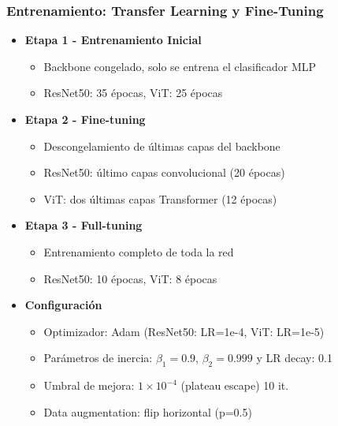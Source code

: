 \begin{frame}
\frametitle{Entrenamiento: Transfer Learning y Fine-Tuning}
\begin{itemize}
    \item \textbf{Etapa 1 - Entrenamiento Inicial}
    \begin{itemize}
        \item Backbone congelado, solo se entrena el clasificador MLP
        \item ResNet50: 35 épocas, ViT: 25 épocas
    \end{itemize}
    \item \textbf{Etapa 2 - Fine-tuning}
    \begin{itemize}
        \item Descongelamiento de últimas capas del backbone
        \item ResNet50: último capas convolucional (20 épocas)
        \item ViT: dos últimas capas Transformer (12 épocas)
    \end{itemize}
    \item \textbf{Etapa 3 - Full-tuning}
    \begin{itemize}
        \item Entrenamiento completo de toda la red
        \item ResNet50: 10 épocas, ViT: 8 épocas
    \end{itemize}
    \item \textbf{Configuración}
    \begin{itemize}
        \item Optimizador: Adam (ResNet50: LR=1e-4, ViT: LR=1e-5)
        \item Parámetros de inercia: $\beta_1=0.9$, $\beta_2=0.999$ y LR decay: 0.1
        \item Umbral de mejora: $1\times 10^{-4}$ (plateau escape) 10 it.
        \item Data augmentation: flip horizontal (p=0.5)
    \end{itemize}
\end{itemize}
\end{frame}


